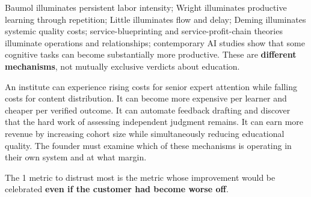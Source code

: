 Baumol illuminates persistent labor intensity; Wright illuminates productive learning through repetition; Little illuminates flow and delay; Deming illuminates systemic quality costs; service-blueprinting and service-profit-chain theories illuminate operations and relationships; contemporary AI studies show that some cognitive tasks can become substantially more productive. These are \textbf{different mechanisms}, not mutually exclusive verdicts about education.

An institute can experience rising costs for senior expert attention while falling costs for content distribution. It can become more expensive per learner and cheaper per verified outcome. It can automate feedback drafting and discover that the hard work of assessing independent judgment remains. It can earn more revenue by increasing cohort size while simultaneously reducing educational quality. The founder must examine which of these mechanisms is operating in their own system and at what margin.

The 1 metric to distrust most is the metric whose improvement would be celebrated \textbf{even if the customer had become worse off}.
